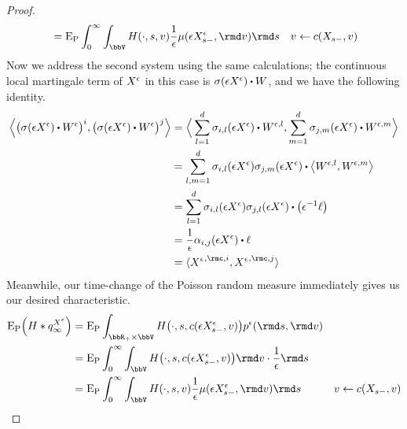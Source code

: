 \begin{proof}
\begin{align*}
    &= \Exp_\Prb \int_0^\infty \int_\vecSpace H(\cdot, s, \markVar) \frac1\epsilon \affJump(\Xe_{s-}, \rmd\markVar) \rmd s & \markVar \leftarrow \thinner(\X_{s-}, \markVar) \\
  \end{align*}
  Now we address the second system using the same calculations; the continuous local martingale term of $X^\epsilon$ in this case is $\affDiffSqrt(\Xe)\shortInt\W$, and we have the following identity.
  \begin{align*}
    \Bprj{\big(\affDiffSqrt(\Xe) \shortInt \W^\epsilon\big)^i}{\big(\affDiffSqrt(\Xe) \shortInt\W^\epsilon\big)^j}
    &= \Bprj{\sum_{l=1}^d \affDiffSqrt_{i,l}(\Xe) \shortInt\W^{\epsilon,l}}{\sum_{m=1}^d \affDiffSqrt_{j,m}(\Xe) \shortInt\W^{\epsilon,m}} \\
    &= \sum_{l,m=1}^d \affDiffSqrt_{i,l}(\Xe)\affDiffSqrt_{j,m}(\Xe) \shortInt \bprj{\W^{\epsilon,l}}{\W^{\epsilon,m}} \\
    &= \sum_{l=1}^d \affDiffSqrt_{i,l}(\Xe)\affDiffSqrt_{j,l}(\Xe) \shortInt \big( \epsilon^{-1} \leb \big) \\
    &= \frac1\epsilon \affDiff_{i,j}(\Xe) \shortInt \leb \\
    &= \prj{{\Xee}^{,\rmc,i}}{{\Xee}^{,\rmc,j}}
  \end{align*}
  Meanwhile, our time-change of the Poisson random measure immediately gives us our desired characteristic.
  \begin{align*}
    \Exp_\Prb\Big( H \ast \jumpMeas^{\Xee}_\infty \Big)
    &= \Exp_\Prb \int_{\bbR_+\times\vecSpace} H\big(\cdot, s, \thinner(\Xe_{s-}, \markVar) \big) \poisRM^\epsilon(\rmd s, \rmd\markVar) \\
    &= \Exp_\Prb \int_0^\infty \int_\vecSpace H\big(\cdot, s, \thinner(\Xe_{s-}, \markVar) \big) \rmd\markVar \cdot \frac1\epsilon \rmd s \\
    &= \Exp_\Prb \int_0^\infty \int_\vecSpace H(\cdot, s, \markVar) \frac1\epsilon \affJump(\Xe_{s-}, \rmd\markVar) \rmd s & \markVar \leftarrow \thinner(\X_{s-}, \markVar) \\
  \end{align*}

\end{proof}
